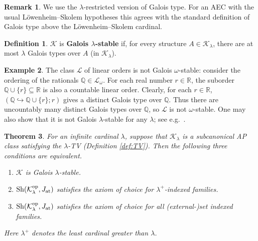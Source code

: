 \documentclass[10pt]{amsart}
\numberwithin{equation}{section}
\theoremstyle{plain}
\newtheorem{theorem}{Theorem}[section]
\theoremstyle{definition}
\newtheorem{definition}[theorem]{Definition}
\newtheorem{example}[theorem]{Example}
\newtheorem*{remark}{Remark}
\newcommand{\om}{\omega}
\newcommand{\K}{\mathcal{K}}
\newcommand{\R}{\mathbb{R}}
\newcommand{\embed}{\hookrightarrow}
\begin{document}
\begin{remark}
We use the $\lambda$-restricted version of Galois type.
For an AEC with the usual L\"owenheim--Skolem hypotheses this agrees with the standard definition of Galois type above the L\"owenheim--Skolem cardinal.
\end{remark}

\begin{definition}
$\K$ is {\bf Galois $\lambda$-stable} if, for every structure $A\in\K_\lambda$, there are at most $\lambda$ Galois types over $A$ (in $\K_\lambda$).
\end{definition}

\begin{example}\label{exa:LO-non-stable}
The class $\mathcal{L}$ of linear orders is not Galois $\om$-stable:
consider the ordering of the rationals $\mathbb{Q}\in\mathcal{L}_\om$.
For each real number $r\in\mathbb{R}$, the suborder $\mathbb{Q}\cup\{r\}\subseteq\mathbb{R}$ is also a countable linear order.
Clearly, for each $r\in\R$, $(\mathbb{Q}\embed\mathbb{Q}\cup\{r\};r)$ gives a distinct Galois type over $\mathbb{Q}$.
Thus there are uncountably many distinct Galois types over $\mathbb{Q}$, so $\mathcal{L}$ is not $\om$-stable.
One may also show that it is not Galois $\lambda$-stable for any $\lambda$; see e.g.~\cite{Kei76}.
\end{example}


\begin{theorem}\label{thm:main-stability-thm}
For an infinite cardinal $\lambda$, suppose that $\K_\lambda$ is a subcanonical AP class satisfying the $\lambda$-TV (Definition \ref{def:TV}). Then the following three conditions are equivalent.
\begin{enumerate}
\item $\K$ is Galois $\lambda$-stable.
\item ${\rm Sh}(\K^{\rm op}_\lambda,J_{\rm at})$ satisfies the axiom of choice for $\lambda^+$-indexed families.
\item ${\rm Sh}(\K^{\rm op}_\lambda,J_{\rm at})$ satisfies the axiom of choice for all (external-)set indexed families.
\end{enumerate}
Here $\lambda^+$ denotes the least cardinal greater than $\lambda$.
\end{theorem}
\end{document}
